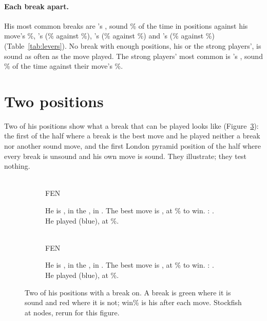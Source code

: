 \documentclass[11pt]{article}
\begin{document}
\LeverTable

\paragraph{Each break apart.} His most common breaks are \LevOneStructure's \LevOneBreak, sound
\LevOneL\% of the time in \LevOneN{} positions against his move's \LevOneOwn\%,
\LevTwoStructure's \LevTwoBreak{} (\LevTwoL\% against \LevTwoOwn\%), \LevThreeStructure's
\LevThreeBreak{} (\LevThreeL\% against \LevThreeOwn\%) and \LevFourStructure's \LevFourBreak{}
(\LevFourL\% against \LevFourOwn\%) (Table~\ref{tab:levers}). No break with enough positions, his
or the strong players', is sound as often as the move played. The strong players' most common is
\StrongLevOneStructure's \StrongLevOneBreak, sound \StrongLevOneL\% of the time against their
move's \StrongLevOneOwn\%.

\StrongStructureTable

\section{Two positions}

Two of his positions show what a break that can be played looks like (Figure~\ref{fig:examples}):
the first of the \EaHalf{} half where a break is the best move and he played neither a break nor
another sound move, and the first London pyramid position of the \EbHalf{} half where every break
is unsound and his own move is sound. They illustrate; they test nothing.

\begin{figure}[ht]
\centering
\begin{subfigure}[t]{0.48\textwidth}
\centering
\EaBoard\\[0.3em]
{\footnotesize FEN \EaFen}
\caption{He is \EaMover, in the \EaPhase, in \EaStructure. The best move is \EaBest, at
\EaWpBest\% to win. \EaBreakLabel: \EaBreaks. He played \EaPlayed{} (blue), \EaPlayedSound{} at
\EaWpPlayed\%.}
\label{fig:due}
\end{subfigure}\hfill
\begin{subfigure}[t]{0.48\textwidth}
\centering
\EbBoard\\[0.3em]
{\footnotesize FEN \EbFen}
\caption{He is \EbMover, in the \EbPhase, in \EbStructure. The best move is \EbBest, at
\EbWpBest\% to win. \EbBreakLabel: \EbBreaks. He played \EbPlayed{} (blue), \EbPlayedSound{} at
\EbWpPlayed\%.}
\label{fig:early}
\end{subfigure}
\caption{Two of his positions with a break on. A break is green where it is sound and red where
it is not; win\% is his after each move. Stockfish at \GradeNodes{} nodes, rerun for this
figure.}
\label{fig:examples}
\end{figure}
\end{document}
